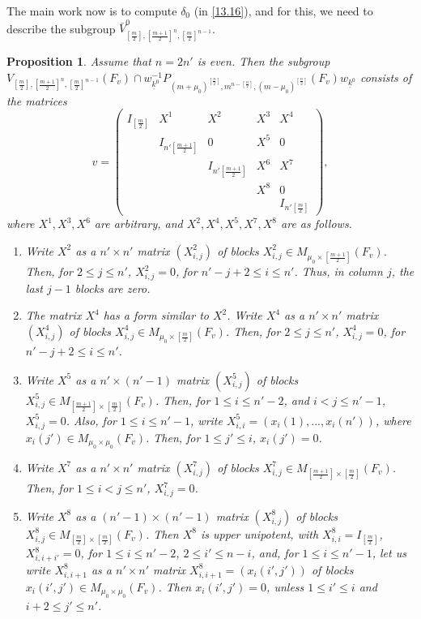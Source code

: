 \documentclass[12pts]{amsart}
\newtheorem{prop}[thm]{Proposition}
\begin{document}
The main work now is to compute $\delta_0$ (in \eqref{13.16}), and for this, we need to describe the subgroup $\bar{V}_{[\frac{m}{2}],[\frac{m+1}{2}]^n,[\frac{m}{2}]^{n-1}}^0$.

\begin{prop}\label{prop 13.6}
Assume that $n=2n'$ is even. Then the subgroup\\ $V_{[\frac{m}{2}],[\frac{m+1}{2}]^n,[\frac{m}{2}]^{n-1}}(F_v)\cap w^{-1}_{\underline{k}^0}P_{(m+\mu_0)^{[\frac{n}{2}]},m^{n-[\frac{n}{2}]}, (m-\mu_0)^{[\frac{n}{2}]}}(F_v)w_{\underline{k}^0}$ consists of the matrices 
\begin{equation}\label{13.22}
v=\begin{pmatrix}I_{[\frac{m}{2}]}&X^1&X^2&X^3&X^4\\&I_{n'[\frac{m+1}{2}]}&0&X^5&0\\&&I_{n'[\frac{m+1}{2}]}&X^6&X^7\\&&&X^8&0\\&&&&I_{n'[\frac{m}{2}]}\end{pmatrix},
\end{equation}
where $X^1, X^3, X^6$ are arbitrary, and $X^2, X^4, X^5, X^7, X^8$ are as follows.\\
\begin{enumerate}
	\item Write $X^2$ as a $n'\times n'$ matrix $(X^2_{i,j})$ of blocks $X^2_{i,j}\in M_{\mu_0\times [\frac{m+1}{2}]}(F_v)$. Then, for $2\leq j\leq n'$, $X^2_{i,j}=0$, for $n'-j+2\leq i\leq n'$. Thus, in column $j$, the last $j-1$ blocks are zero.\\
	\item The matrix $X^4$ has a form similar to $X^2$. Write $X^4$ as a $n'\times n'$ matrix $(X^4_{i,j})$ of blocks $X^4_{i,j}\in M_{\mu_0\times [\frac{m}{2}]}(F_v)$. Then, for $2\leq j\leq n'$, $X^4_{i,j}=0$, for $n'-j+2\leq i\leq n'$.\\
	\item Write $X^5$ as a $n'\times (n'-1)$ matrix $(X^5_{i,j})$ of blocks $X^5_{i,j}\in M_{[\frac{m+1}{2}]\times [\frac{m}{2}]}(F_v)$. Then, for $1\leq i\leq n'-2$, and $i<j\leq n'-1$, $X^5_{i,j}=0$. Also, for $1\leq i\leq n'-1$, write $X^5_{i,i}=(x_i(1),...,x_i(n'))$, where $x_i(j')\in M_{\mu_0\times \mu_0}(F_v)$. Then, for $1\leq j'\leq i$, $x_i(j')=0$.\\
	\item Write $X^7$ as a $n'\times n'$ matrix $(X^7_{i,j})$ of blocks $X^7_{i,j}\in M_{[\frac{m+1}{2}]\times [\frac{m}{2}]}(F_v)$. Then, for $1\leq i<j\leq n'$, $X^7_{i,j}=0$.\\
	\item Write $X^8$ as a $(n'-1)\times (n'-1)$ matrix $(X^8_{i,j})$ of blocks $X^8_{i,j}\in M_{[\frac{m}{2}]\times [\frac{m}{2}]}(F_v)$. Then $X^8$ is upper unipotent, with $X^8_{i,i}=I_{[\frac{m}{2}]}$, $X^8_{i,i+i'}=0$, for $1\leq i\leq n'-2$, $2\leq i'\leq n-i$, and, for $1\leq i\leq n'-1$, let us write $X^8_{i,i+1}$ as a $n'\times n'$ matrix  $X^8_{i,i+1}=(x_i(i',j'))$ of blocks $x_i(i',j')\in M_{\mu_0\times \mu_0}(F_v)$. Then $x_i(i',j')=0$, unless $1\leq i'\leq i$ and $i+2\leq j'\leq n'$. 
\end{enumerate}

\end{prop} 
\end{document}
